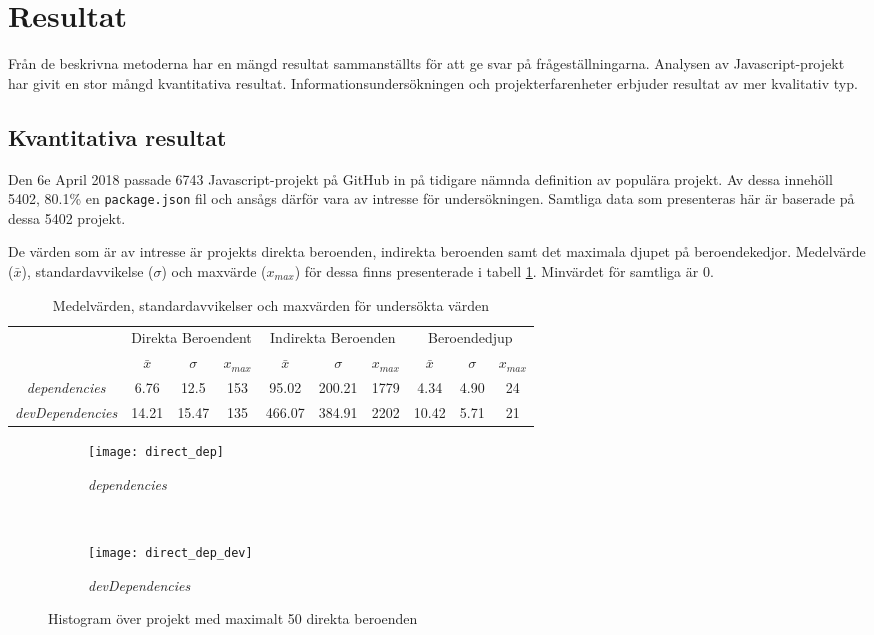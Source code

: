 \section{Resultat}
\label{sec:joel_o-results}
Från de beskrivna metoderna har en mängd resultat sammanställts för att ge svar på frågeställningarna. Analysen av Javascript-projekt har givit en stor mångd kvantitativa resultat. Informationsundersökningen och projekterfarenheter erbjuder resultat av mer kvalitativ typ.

\subsection{Kvantitativa resultat}
\label{sec:joel_o-results-kvant}
Den 6e April 2018 passade 6743 Javascript-projekt på GitHub in på tidigare nämnda definition av populära projekt. Av dessa innehöll 5402, 80.1\% en \texttt{package.json} fil och ansågs därför vara av intresse för undersökningen. Samtliga data som presenteras här är baserade på dessa 5402 projekt.

De värden som är av intresse är projekts direkta beroenden, indirekta beroenden samt det maximala djupet på beroendekedjor.
Medelvärde ($\bar{x}$), standardavvikelse ($\sigma$) och maxvärde ($x_{max}$) för dessa finns presenterade i tabell \ref{tab:beroende-data}. Minvärdet för samtliga är 0.

\begin{table}
  \centering
  \begin{tabular}{c | c c c | c c c | c c c |}
    \cline{2-10}
    & \multicolumn{3}{c|}{Direkta Beroendent} & \multicolumn{3}{c|}{Indirekta Beroenden} & \multicolumn{3}{c|}{Beroendedjup} \\ \cline{2-10}
    & $\bar{x}$ & $\sigma$ & $x_{max}$ & $\bar{x}$ & $\sigma$ & $x_{max}$ & $\bar{x}$ & $\sigma$ & $x_{max}$ \\ \hline
    \multicolumn{1}{|c|}{\textit{dependencies}} & 6.76 & 12.5 & 153 & 95.02 & 200.21 & 1779 & 4.34 & 4.90 & 24 \\ \hline
    \multicolumn{1}{|c|}{\textit{devDependencies}} & 14.21 & 15.47 & 135 & 466.07 & 384.91 & 2202 & 10.42 & 5.71 & 21 \\
    \hline
  \end{tabular}
  \caption{Medelvärden, standardavvikelser och maxvärden för undersökta värden}
  \label{tab:beroende-data}
\end{table}

\begin{figure*}[]
    \centering
    \begin{subfigure}[]{0.5\textwidth}
        \centering
        \texttt{[image: direct\_dep]}
        \caption{\textit{dependencies}}
    \end{subfigure}%
    ~
    \begin{subfigure}[]{0.5\textwidth}
        \centering
        \texttt{[image: direct\_dep\_dev]}
        \caption{\textit{devDependencies}}
    \end{subfigure}
    \caption{Histogram över projekt med maximalt 50 direkta beroenden}
    \label{fig:direct-dep}
\end{figure*}

